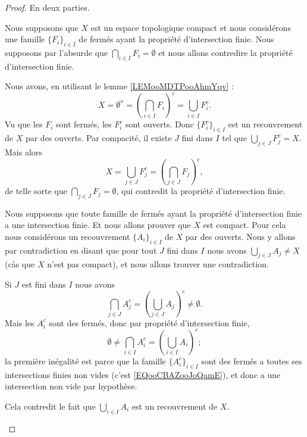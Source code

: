\begin{proof}
	En deux parties.
	\begin{subproof}
		\spitem[\( \Rightarrow\)]
		Nous supposons que \( X\) est un espace topologique compact et nous considérons une famille \( \{ F_i \}_{i\in I}\) de fermés ayant la propriété d'intersection finie. Nous supposons par l'absurde que \( \bigcap_{i\in I}F_i=\emptyset\) et nous allons contredire la propriété d'intersection finie.

		Nous avons, en utilisant le lemme \ref{LEMooMDTPooAhmYqv} :
		\begin{equation}
			X=\emptyset^x=\left( \bigcap_{i\in I}F_i \right)^c=\bigcup_{i\in I}F_i^c.
		\end{equation}
		Vu que les \( F_i\) sont fermés, les \( F_i^c\) sont ouverts. Donc \( \{ F_i^c \}_{i\in I}\) est un recouvrement de \( X\) par des ouverts. Par compacité, il existe \( J\) fini dans \( I\) tel que \( \bigcup_{j\in J}F_j^c=X\). Mais alors
		\begin{equation}
			X=\bigcup_{j\in J}F_j^c=\left( \bigcap_{j\in J}F_j \right)^c,
		\end{equation}
		de telle sorte que \( \bigcap_{j\in J}F_j=\emptyset\), qui contredit la propriété d'intersection finie.

		\spitem[\( \Leftarrow\)]
		Nous supposons que toute famille de fermés ayant la propriété d'intersection finie a une intersection finie. Et nous allons prouver que \( X\) est compact. Pour cela nous considérons un recouvrement \( \{ A_i \}_{i\in I}\) de \( X\) par des ouverts. Nous y allons par contradiction en disant que pour tout \( J\) fini dans \( I\) nous avons \( \bigcup_{j\in J}A_j\neq X\) (càs que \( X\) n'est pas compact), et nous allons trouver une contradiction.

		Si \( J\) est fini dans \( I\) nous avons
		\begin{equation}		\label{EQooCBAZooJoQamE}
			\bigcap_{j\in J}A_j^c=\left( \bigcup_{j\in J}A_j \right)^c\neq \emptyset.
		\end{equation}
		Mais les \( A_i^c\) sont des fermés, donc par propriété d'intersection finie,
		\begin{equation}
			\emptyset\neq\bigcap_{i\in I}A_i^c=\left( \bigcup_{i\in I}A_i \right)^c;
		\end{equation}
		la première inégalité est parce que la famille \( \{ A_i^c \}_{i\in I}\) sont des fermés a toutes ses intersections finies non vides (c'est \eqref{EQooCBAZooJoQamE}), et donc a une intersection non vide par hypothèse.

		Cela contredit le fait que \( \bigcup_{i\in I}A_i\) est un recouvrement de \( X\).
	\end{subproof}
\end{proof}

